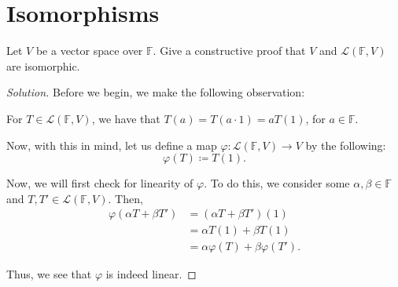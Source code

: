 \documentclass{article}
\newenvironment{solution}{\begin{proof}[Solution]}{\end{proof}}
\begin{document}
	\section{Isomorphisms}
	\begin{hw}
		Let $V$ be a vector space over $\mathbb{F}$. Give a constructive proof that $V$ and $\mathcal L (\mathbb{F},V)$ are isomorphic.
	\end{hw}
	\begin{solution}
		Before we begin, we make the following observation:
		\begin{rmk}
			For $T \in \mathcal L(\mathbb{F}, V)$, we have that $T(a) = T(a \cdot 1) = aT(1)$, for $a \in \mathbb{F}$.
		\end{rmk}
	
		\begin{comment}
			Now, with this in mind, let us define some $\varphi : V \rightarrow \mathcal L(\mathbb{F}, V)$ as follow:
		\begin{equation*}
			\varphi(v) \coloneq T_{v},
		\end{equation*}
		where we define $T_{v} : \mathbb{F} \rightarrow V $, for $a \in \mathbb{F}$, as:
		\begin{equation*}
			T_{v}(a) \coloneq av.
		\end{equation*}
	
		Now, we will first for linearity of $\varphi$. First, we consider some $\alpha, \beta \in \mathbb{F}$ and $v, v' \in V$. Then,
		\begin{align*}
			\varphi(\alpha v + \beta v') &= T
		\end{align*}
		\end{comment}
	
		Now, with this in mind, let us define a map $\varphi : \mathcal L(\mathbb{F}, V) \rightarrow V$ by the following:
		\begin{equation*}
			\varphi(T) \coloneq T(1).
		\end{equation*}
	
		Now, we will first check for linearity of $\varphi$. To do this, we consider some $\alpha, \beta \in \mathbb{F}$ and $T, T' \in \mathcal L(\mathbb{F}, V)$. Then,
		\begin{align*}
			\varphi(\alpha T + \beta T') &= (\alpha T + \beta T')(1) \\
			&= \alpha T(1) + \beta T(1) \\
			&= \alpha \varphi(T) + \beta \varphi(T').
		\end{align*}
	
		Thus, we see that $\varphi$ is indeed linear.
		

\end{solution}
\end{document}
